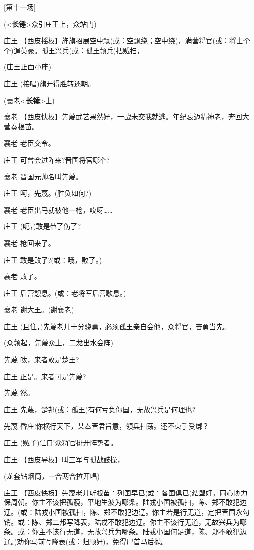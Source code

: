{[}第十一场{]}

(\textless{}\textbf{长锤}\textgreater{}众引庄王上，众站门)

庄王
【西皮摇板】旌旗招展空中飘(或：空飘绕；空中绕)，满营将官(或：将士个个)逞英豪。孤王兴兵(或：孤王领兵)把贼扫，

(庄王正面小座)

庄王 (接唱)旗开得胜转还朝。

(襄老\textless{}\textbf{长锤}\textgreater{}上)

襄老
【西皮快板】先蔑武艺果然好，一战未交我就逃。年纪衰迈精神老，奔回大营奏根苗。

襄老 老臣交令。

庄王 可曾会过阵来?晋国将官哪个?

襄老 晋国元帅名叫先蔑。

庄王 呵，先蔑。(胜负如何?)

襄老 老臣出马就被他一枪，哎呀\ldots{}\ldots{}

庄王 (呃，)敢是带了伤了?

襄老 枪回来了。

庄王 敢是败了?(或：哦，败了。)

襄老 败了。

庄王 后营憩息。(或：老将军后营歇息。)

襄老 谢大王。(谢襄老)

庄王 (且住，)先蔑老儿十分骁勇，必须孤王亲自会他，众将官，奋勇当先。

(众领起，先蔑众上，二龙出水会阵)

先蔑 呔，来者敢是楚王?

庄王 正是。来者可是先蔑?

先蔑 然。

庄王 先蔑，楚邦(或：孤王)有何亏负你国，无故兴兵是何理也?

先蔑 昏庄!你横行天下，某奉晋君旨意，领兵扫荡。还不束手受绑？

庄王 (贼子)住口!众将官排开阵势者。

庄王 【西皮导板】叫三军与孤战鼓操，

(龙套钻烟筒，一合两合拉开唱)

庄王
【西皮快板】先蔑老儿听根苗：列国早已(或：各国俱已)结盟好，同心协力保周朝。你主不该把孤藐，平地生波为哪条。陆戎小国被孤扫，陈、郑不敢犯边辽。(或：陆戎小国被孤扫，陈、郑不敢犯边辽。你主若是行无道，定把晋国永勾销。或：陈、郑二邦写降表，陆戎不敢犯边辽。你主不该行无道，无故兴兵为哪条。或：你主不该行无道，无故兴兵为哪条。陆戎小国何足道，陈、郑不敢犯边辽。)劝你马前写降表(或：归顺好)，免得尸首马后抛。

